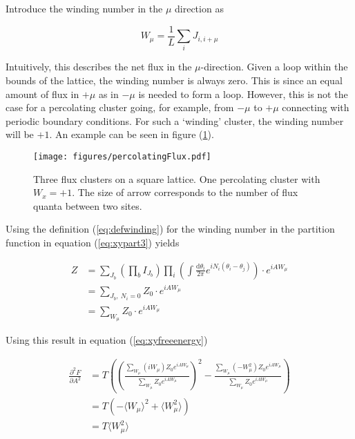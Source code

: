 Introduce the winding number in the $\mu$ direction as

\begin{equation}
    W_\mu = \frac{1}{L} \sum_i J_{i, i+\mu}
\label{eq:defwinding}
\end{equation}

Intuitively, this describes the net flux in the $\mu$-direction. Given a loop within the bounds of the lattice, the winding number is always zero. This is since an equal amount of flux in $+\mu$ as in $-\mu$ is needed to form a loop. However, this is not the case for a percolating cluster going, for example, from $-\mu$ to $+\mu$ connecting with periodic boundary conditions. For such a `winding' cluster, the winding number will be $+1$. An example can be seen in figure (\ref{fig:fluxpercolation}).

\begin{figure}[h!]
    \centering
        \texttt{[image: figures/percolatingFlux.pdf]}
    \caption{Three flux clusters on a square lattice. One percolating cluster with $W_x = +1$. The size of arrow corresponds to the number of flux quanta between two sites.}
    \label{fig:fluxpercolation}
\end{figure}

Using the definition (\ref{eq:defwinding}) for the winding number in the partition function in equation (\ref{eq:xypart3}) yields

\begin{align}
    Z &= \sum_{J_b} \left ( \prod_b I_{J_b} \right ) \prod_i \left ( \int \frac{\mathrm d \theta_i}{2 \pi} e^{i N_i (\theta_i - \theta_j)} \right ) \cdot e^{i A W_\mu} \\
    &= \sum_{J_b, \ N_i = 0} Z_0 \cdot e^{i A W_\mu} \\
    &= \sum_{W_\mu} Z_0 \cdot e^{i A W_\mu}
\end{align}

Using this result in equation (\ref{eq:xyfreeenergy})

\begin{align}
    \frac{\partial^2 F}{\partial A^2} &= T \left ( \left ( \frac{\sum_{W_\mu} (i W_\mu) Z_0 e^{iAW_\mu}}{\sum_{W_\mu} Z_0 e^{iAW_\mu}} \right )^2 - \frac{\sum_{W_\mu} (- W_\mu^2) Z_0 e^{iAW_\mu}}{\sum_{W_\mu} Z_0 e^{iAW_\mu}} \right ) \\
%
    &= T \left ( -\langle W_\mu \rangle^2 + \langle W_\mu^2 \rangle \right ) \\
%
    &= T \langle W_\mu^2 \rangle
\end{align}

